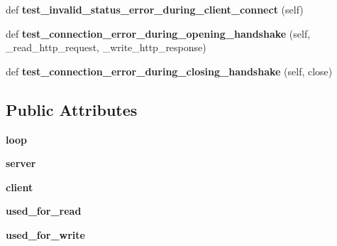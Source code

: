 \begin{DoxyCompactItemize}
\item 
\mbox{\label{classwebsockets_1_1test__client__server_1_1_client_server_tests_af84322455ebdf2aadfd72d40a70a2a14}} 
def {\bfseries test\+\_\+invalid\+\_\+status\+\_\+error\+\_\+during\+\_\+client\+\_\+connect} (self)
\item 
\mbox{\label{classwebsockets_1_1test__client__server_1_1_client_server_tests_a6bbb8e4714d2c2f546b1141cf23a52b6}} 
def {\bfseries test\+\_\+connection\+\_\+error\+\_\+during\+\_\+opening\+\_\+handshake} (self, \+\_\+read\+\_\+http\+\_\+request, \+\_\+write\+\_\+http\+\_\+response)
\item 
\mbox{\label{classwebsockets_1_1test__client__server_1_1_client_server_tests_ad34e1f91959e619bfd537a3adc928a8a}} 
def {\bfseries test\+\_\+connection\+\_\+error\+\_\+during\+\_\+closing\+\_\+handshake} (self, close)
\end{DoxyCompactItemize}
\subsection*{Public Attributes}
\begin{DoxyCompactItemize}
\item 
\mbox{\label{classwebsockets_1_1test__client__server_1_1_client_server_tests_a3d64989ed2a8514a2f6170027e3787b8}} 
{\bfseries loop}
\item 
\mbox{\label{classwebsockets_1_1test__client__server_1_1_client_server_tests_a75cd18c5836ac1b8ba11d3698274cfc2}} 
{\bfseries server}
\item 
\mbox{\label{classwebsockets_1_1test__client__server_1_1_client_server_tests_a1930cf027dd5604d04a7f8a3b881582f}} 
{\bfseries client}
\item 
\mbox{\label{classwebsockets_1_1test__client__server_1_1_client_server_tests_a1f91ffc6d69ab029789d54d9bdd05774}} 
{\bfseries used\+\_\+for\+\_\+read}
\item 
\mbox{\label{classwebsockets_1_1test__client__server_1_1_client_server_tests_af725882fb40c4c852d5703a109cdb6fa}} 
{\bfseries used\+\_\+for\+\_\+write}
\end{DoxyCompactItemize}
